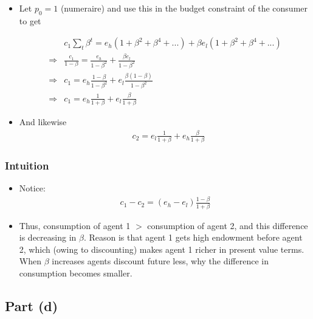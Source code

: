\documentclass{scrartcl}
\newcommand{\bit}{\begin{itemize}}
\newcommand{\eit}{\end{itemize}}
\begin{document}
\begin{itemize}
	\item Let $p_0=1$ (numeraire) and use this in the budget constraint of the consumer to get
	
	\begin{align}
	&c_1 \sum_t \beta^t= e_h (1+\beta^2+\beta^4+...)+ \beta e_l (1+\beta^2+\beta^4+...)  \\
	\Rightarrow &\frac{c_1}{1-\beta}=\frac{e_h}{1-\beta^2}+\frac{\beta e_l}{1-\beta^2}  \\
	\Rightarrow &c_{1}=e_h\frac{1-\beta}{1-\beta^2}+e_l\frac{\beta(1-\beta)}{1-\beta^2}  \\
	\Rightarrow &c_{1}=e_h \frac{1}{1+\beta}+e_l \frac{\beta}{1+\beta}
	\end{align}
	
	\item And likewise
	\begin{align}
	&c_{2}=e_l \frac{1}{1+\beta}+e_h \frac{\beta}{1+\beta}
	\end{align}
	
	\end{itemize}

\subsubsection*{Intuition}

\bit

\item Notice:
\begin{align}
c_1-c_2=\left( e_h-e_l\right)\frac{1-\beta}{1+\beta}
\end{align}

\item Thus, consumption of agent 1 $>$ consumption of agent 2, and this difference is decreasing in $\beta$. Reason is that agent 1 gets high endowment before agent 2, which (owing to discounting) makes agent 1 richer in present value terms. When $\beta$ increases agents discount future less, why the difference in consumption becomes smaller.

\eit


\subsection*{Part (d)}
\end{document}
